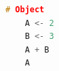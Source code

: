 \begin{lstlisting}[language=c++,label={code:05_03},caption={Assigning values to objects}]
	# Object
	A <- 2
	B <- 3
	A + B
	A
\end{lstlisting}

